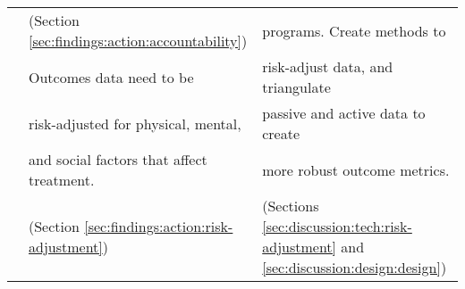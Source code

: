 \begin{table*}[t]
\begin{tabular}{lll}
& (Section \ref{sec:findings:action:accountability}) & programs. Create methods to \\
\cline{2--2}
& Outcomes data need to be & risk-adjust data, and triangulate \\
& risk-adjusted for physical, mental, &  passive and active data to create  \\
& and social factors that affect treatment. & more robust outcome metrics. \\
& (Section \ref{sec:findings:action:risk-adjustment}) & (Sections \ref{sec:discussion:tech:risk-adjustment} and \ref{sec:discussion:design:design}) \\
\bottomrule
\end{tabular}
\caption{}
\label{tab:discussion:findings-implications}
\end{table*}